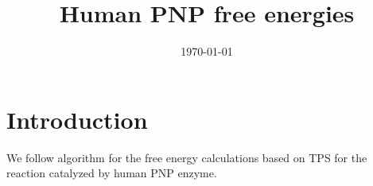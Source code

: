 \documentclass[notitlepage,preprint,%
amssymb,amsmath,
 aip,jcp%
]{revtex4-1}
\begin{document}
\title{Human PNP free energies}
\author{}
%
\date{\today}
\maketitle


\section{Introduction}
We follow algorithm for the free energy calculations based on TPS for the reaction catalyzed by 
human PNP enzyme. 



\end{document}
